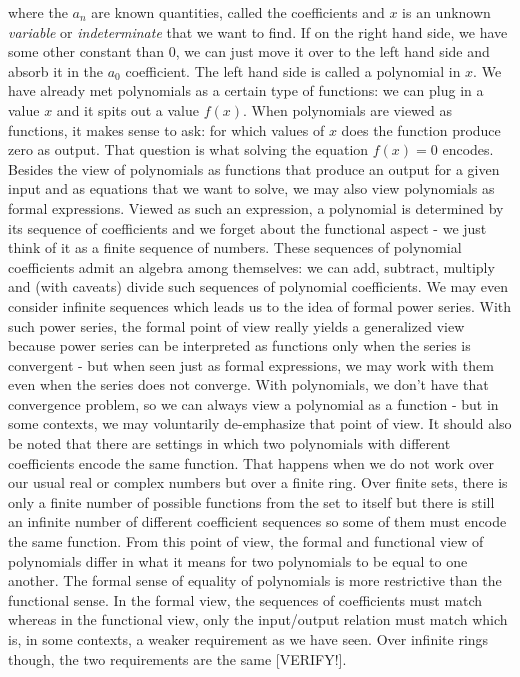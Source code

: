 where the $a_n$ are known quantities, called the coefficients and $x$ is an unknown \emph{variable} or \emph{indeterminate} that we want to find. If on the right hand side, we have some other constant than $0$, we can just move it over to the left hand side and absorb it in the $a_0$ coefficient. The left hand side is called a polynomial in $x$. We have already met polynomials as a certain type of functions: we can plug in a value $x$ and it spits out a value $f(x)$. When polynomials are viewed as functions, it makes sense to ask: for which values of $x$ does the function produce zero as output. That question is what solving the equation $f(x) = 0$ encodes. Besides the view of polynomials as functions that produce an output for a given input and as equations that we want to solve, we may also view polynomials as formal expressions. Viewed as such an expression, a polynomial is determined by its sequence of coefficients and we forget about the functional aspect - we just think of it as a finite sequence of numbers. These sequences of polynomial coefficients admit an algebra among themselves: we can add, subtract, multiply and (with caveats) divide such sequences of polynomial coefficients. We may even consider infinite sequences which leads us to the idea of formal power series. With such power series, the formal point of view really yields a generalized view because power series can be interpreted as functions only when the series is convergent - but when seen just as formal expressions, we may work with them even when the series does not converge. With polynomials, we don't have that convergence problem, so we can always view a polynomial as a function - but in some contexts, we may voluntarily de-emphasize that point of view. It should also be noted that there are settings in which two polynomials with different coefficients encode the same function. That happens when we do not work over our usual real or complex numbers but over a finite ring. Over finite sets, there is only a finite number of possible functions from the set to itself but there is still an infinite number of different coefficient sequences so some of them must encode the same function. From this point of view, the formal and functional view of polynomials differ in what it means for two polynomials to be equal to one another. The formal sense of equality of polynomials is more restrictive than the functional sense. In the formal view, the sequences of coefficients must match whereas in the functional view, only the input/output relation must match which is, in some contexts, a weaker requirement as we have seen. Over infinite rings though, the two requirements are the same [VERIFY!].

